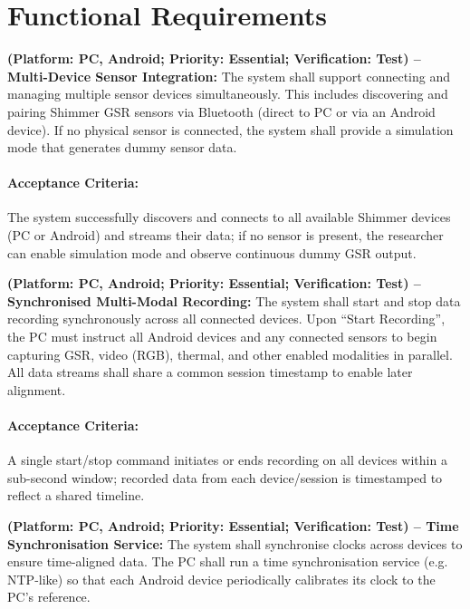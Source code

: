 \section{Functional Requirements}

\begin{description}[style=unboxed,leftmargin=0cm]
    \item[\textbf{FR1}] \textbf{(Platform: PC, Android; Priority: Essential; Verification: Test) – Multi-Device Sensor Integration:} The system shall support connecting and managing multiple sensor devices simultaneously. This includes discovering and pairing Shimmer GSR sensors via Bluetooth (direct to PC or via an Android device). If no physical sensor is connected, the system shall provide a simulation mode that generates dummy sensor data.
    \paragraph{Acceptance Criteria:} The system successfully discovers and connects to all available Shimmer devices (PC or Android) and streams their data; if no sensor is present, the researcher can enable simulation mode and observe continuous dummy GSR output.

    \item[\textbf{FR2}] \textbf{(Platform: PC, Android; Priority: Essential; Verification: Test) – Synchronised Multi-Modal Recording:} The system shall start and stop data recording synchronously across all connected devices. Upon “Start Recording”, the PC must instruct all Android devices and any connected sensors to begin capturing GSR, video (RGB), thermal, and other enabled modalities in parallel. All data streams shall share a common session timestamp to enable later alignment.
    \paragraph{Acceptance Criteria:} A single start/stop command initiates or ends recording on all devices within a sub-second window; recorded data from each device/session is timestamped to reflect a shared timeline.

    \item[\textbf{FR3}] \textbf{(Platform: PC, Android; Priority: Essential; Verification: Test) – Time Synchronisation Service:} The system shall synchronise clocks across devices to ensure time-aligned data. The PC shall run a time synchronisation service (e.g. NTP-like) so that each Android device periodically calibrates its clock to the PC’s reference.

\end{description}
